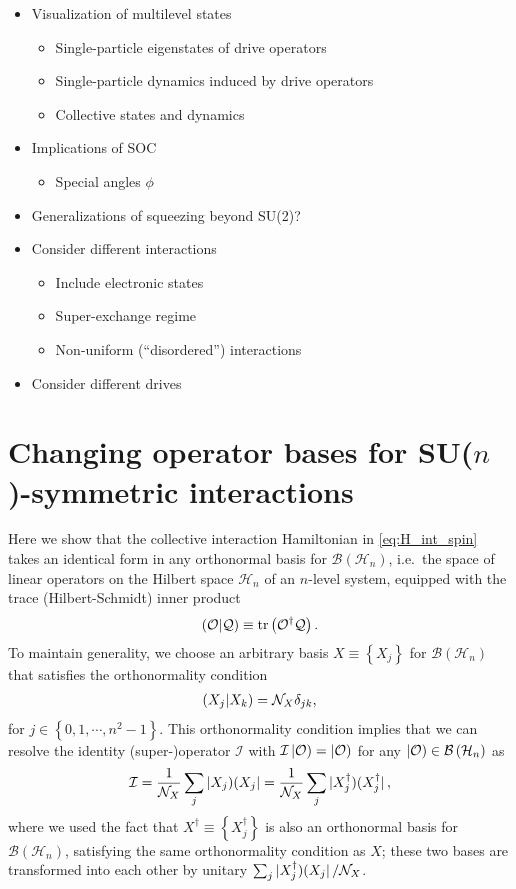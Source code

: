 \documentclass[nofootinbib,notitlepage,11pt]{revtex4-2}
\newcommand{\f}[2]{\dfrac{#1}{#2}} %
\newcommand{\p}[1]{\left(#1\right)} %
\renewcommand{\set}[1]{\left\{#1\right\}} %
\newcommand{\1}{\mathds{1}}
\newcommand{\B}{\mathcal{B}}
\renewcommand{\H}{\mathcal{H}}
\newcommand{\I}{\mathcal{I}}
\newcommand{\N}{\mathcal{N}}
\renewcommand{\O}{\mathcal{O}}
\newcommand{\Q}{\mathcal{Q}}
\def\obra#1{\mathinner{({#1}|}}
\def\oket#1{\mathinner{|{#1})}}
\def\obk#1{\mathinner{({#1})}}
\def\oop#1#2{\oket{#1}\!\obra{#2}}
\begin{document}
\begin{itemize}
\item Visualization of multilevel states
  \begin{itemize}
  \item Single-particle eigenstates of drive operators
  \item Single-particle dynamics induced by drive operators
  \item Collective states and dynamics
  \end{itemize}
\item Implications of SOC
  \begin{itemize}
  \item Special angles $\phi$
  \end{itemize}
\item Generalizations of squeezing beyond SU(2)?
\item Consider different interactions
  \begin{itemize}
  \item Include electronic states
  \item Super-exchange regime
  \item Non-uniform (``disordered'') interactions
  \end{itemize}
\item Consider different drives
\end{itemize}

\appendix

\section{Changing operator bases for SU($n$)-symmetric interactions}
\label{sec:changing_bases}

Here we show that the collective interaction Hamiltonian in
\eqref{eq:H_int_spin} takes an identical form in any orthonormal basis
for $\B\p{\H_n}$, i.e.~the space of linear operators on the Hilbert
space $\H_n$ of an $n$-level system, equipped with the trace
(Hilbert-Schmidt) inner product
\begin{align}
  \obk{\O|\Q} \equiv \tr\p{\O^\dag \Q}.
\end{align}
To maintain generality, we choose an arbitrary basis
$X\equiv\set{X_j}$ for $\B\p{\H_n}$ that satisfies the orthonormality
condition
\begin{align}
  \obk{X_j|X_k} = \N_X \delta_{jk},
\end{align}
for $j\in\set{0,1,\cdots,n^2-1}$.  This orthonormality condition
implies that we can resolve the identity (super-)operator $\I$ with
$\I\oket{\O}=\oket{\O}$ for any $\oket\O\in\B\p{\H_n}$ as
\begin{align}
  \I = \f1{\N_X} \sum_j \oop{X_j}{X_j}
  = \f1{\N_X} \sum_j \oop{X_j^\dag}{X_j^\dag},
\end{align}
where we used the fact that $X^\dag\equiv\set{X_j^\dag}$ is also an
orthonormal basis for $\B\p{\H_n}$, satisfying the same orthonormality
condition as $X$; these two bases are transformed into each other by
unitary $\sum_j\oop{X_j^\dag}{X_j}/\N_X$.
\end{document}

